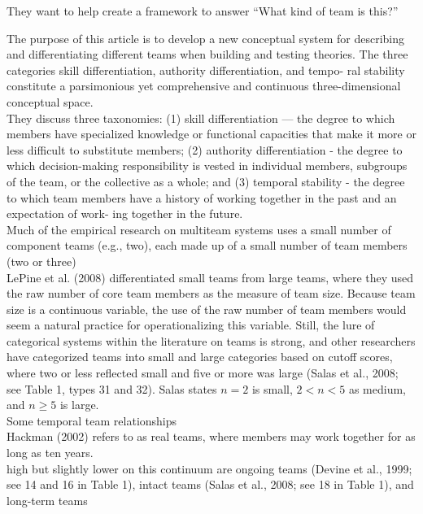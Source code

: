 \documentclass[12pt]{article}
\begin{document}
They want to help create a framework to answer “What kind of team is this?”

The purpose of this article is to develop a new conceptual system for describing and differentiating different teams when building and testing theories. The three categories skill differentiation, authority differentiation, and tempo- ral stability constitute a parsimonious yet comprehensive and continuous three-dimensional conceptual space.\\

They discuss three taxonomies:  (1) skill differentiation — the degree to which members have specialized knowledge or functional capacities that make it more or less difficult to substitute members; (2) authority differentiation - the degree to which decision-making responsibility is vested in individual members, subgroups of the team, or the collective as a whole; and (3) temporal stability - the degree to which team members have a history of working together in the past and an expectation of work- ing together in the future.\\

Much of the empirical research on multiteam systems uses a small number of component teams (e.g., two), each made up of a small number of team members (two or three)\\

LePine et al. (2008) differentiated small teams from large teams, where they used the raw number of core team members as the measure of team size.\cite{meta_teamwork_processes} Because team size is a continuous variable, the use of the raw number of team members would seem a natural practice for operationalizing this variable. Still, the lure of categorical systems within the literature on teams is strong, and other researchers have categorized teams into small and large categories based on cutoff scores, where two or less reflected small and five or more was large (Salas et al., 2008; see Table 1, types 31 and 32). Salas states $n=2$ is small, $2 < n< 5$ as medium, and $n\geq 5$ is large.\cite{team_training}\\

Some temporal team relationships\\

Hackman (2002) refers to as real teams, where members may work together for as long as ten years. \\

high but slightly lower on this continuum are ongoing teams (Devine et al., 1999; see 14 and 16 in Table 1), intact teams (Salas et al., 2008; see 18 in Table 1), and long-term teams \\
\end{document}
